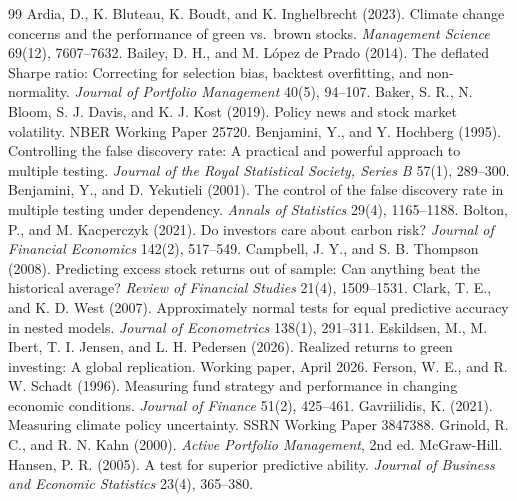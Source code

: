 \label{mainbody:end}
\clearpage
\begin{thebibliography}{99}
 Ardia, D., K. Bluteau, K. Boudt, and K. Inghelbrecht (2023). Climate change concerns and the performance of green vs.\ brown stocks. \textit{Management Science} 69(12), 7607--7632.
 Bailey, D. H., and M. L\'opez de Prado (2014). The deflated Sharpe ratio: Correcting for selection bias, backtest overfitting, and non-normality. \textit{Journal of Portfolio Management} 40(5), 94--107.
 Baker, S. R., N. Bloom, S. J. Davis, and K. J. Kost (2019). Policy news and stock market volatility. NBER Working Paper 25720.
 Benjamini, Y., and Y. Hochberg (1995). Controlling the false discovery rate: A practical and powerful approach to multiple testing. \textit{Journal of the Royal Statistical Society, Series B} 57(1), 289--300.
 Benjamini, Y., and D. Yekutieli (2001). The control of the false discovery rate in multiple testing under dependency. \textit{Annals of Statistics} 29(4), 1165--1188.
 Bolton, P., and M. Kacperczyk (2021). Do investors care about carbon risk? \textit{Journal of Financial Economics} 142(2), 517--549.
 Campbell, J. Y., and S. B. Thompson (2008). Predicting excess stock returns out of sample: Can anything beat the historical average? \textit{Review of Financial Studies} 21(4), 1509--1531.
 Clark, T. E., and K. D. West (2007). Approximately normal tests for equal predictive accuracy in nested models. \textit{Journal of Econometrics} 138(1), 291--311.
 Eskildsen, M., M. Ibert, T. I. Jensen, and L. H. Pedersen (2026). Realized returns to green investing: A global replication. Working paper, April 2026.
 Ferson, W. E., and R. W. Schadt (1996). Measuring fund strategy and performance in changing economic conditions. \textit{Journal of Finance} 51(2), 425--461.
 Gavriilidis, K. (2021). Measuring climate policy uncertainty. SSRN Working Paper 3847388.
 Grinold, R. C., and R. N. Kahn (2000). \textit{Active Portfolio Management}, 2nd ed. McGraw-Hill.
 Hansen, P. R. (2005). A test for superior predictive ability. \textit{Journal of Business and Economic Statistics} 23(4), 365--380.

\end{thebibliography}
